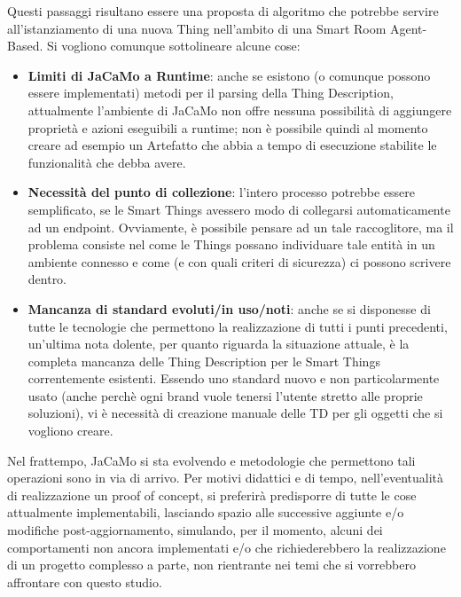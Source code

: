 \documentclass[12pt,a4paper,openright,oneside]{report}
\begin{document}
Questi passaggi risultano essere una proposta di algoritmo che potrebbe servire all'istanziamento di una nuova Thing nell'ambito di una Smart Room Agent-Based. Si vogliono comunque sottolineare alcune cose:

\begin{itemize}
	\item \textbf{Limiti di JaCaMo a Runtime}: anche se esistono (o comunque possono essere implementati) metodi per il parsing della Thing Description, attualmente l'ambiente di JaCaMo non offre nessuna possibilità di aggiungere proprietà e azioni eseguibili a runtime; non è possibile quindi al momento creare ad esempio un Artefatto che abbia a tempo di esecuzione stabilite le funzionalità che debba avere.
	
	\item \textbf{Necessità del punto di collezione}: l'intero processo potrebbe essere semplificato, se le Smart Things avessero modo di collegarsi automaticamente ad un endpoint. Ovviamente, è possibile pensare ad un tale raccoglitore, ma il problema consiste nel come le Things possano individuare tale entità in un ambiente connesso e come (e con quali criteri di sicurezza) ci possono scrivere dentro.
	
	\item \textbf{Mancanza di standard evoluti/in uso/noti}: anche se si disponesse di tutte le tecnologie che permettono la realizzazione di tutti i punti precedenti, un'ultima nota dolente, per quanto riguarda la situazione attuale, è la completa mancanza delle Thing Description per le Smart Things correntemente esistenti. Essendo uno standard nuovo e non particolarmente usato (anche perchè ogni brand vuole tenersi l'utente stretto alle proprie soluzioni), vi è necessità di creazione manuale delle TD per gli oggetti che si vogliono creare.
\end{itemize}


Nel frattempo, JaCaMo si sta evolvendo e metodologie che permettono tali operazioni sono in via di arrivo. Per motivi didattici e di tempo, nell'eventualità di realizzazione un proof of concept, si preferirà predisporre di tutte le cose attualmente implementabili, lasciando spazio alle successive aggiunte e/o modifiche post-aggiornamento, simulando, per il momento, alcuni dei comportamenti non ancora implementati e/o che richiederebbero la realizzazione di un progetto complesso a parte, non rientrante nei temi che si vorrebbero affrontare con questo studio.
\end{document}
